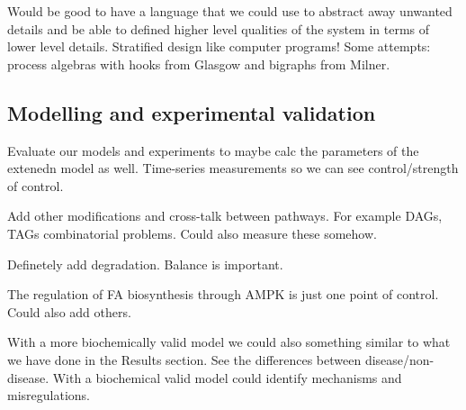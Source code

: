 Would be good to have a language that we could use to abstract away
unwanted details and be able to defined higher level qualities of the
system in terms of lower level details. Stratified design like
computer programs! Some attempts: process algebras with hooks from
Glasgow and bigraphs from Milner.

\subsection{Modelling and experimental validation}
Evaluate our models and experiments to maybe calc the parameters of
the extenedn model as well. Time-series measurements so we can see
control/strength of control.

Add other modifications and cross-talk between pathways. For example
DAGs, TAGs combinatorial problems. Could also measure these somehow.

Definetely add degradation. Balance is important.

The regulation of FA biosynthesis through AMPK is just one point of
control. Could also add others.

With a more biochemically valid model we could also something similar
to what we have done in the Results section. See the differences
between disease/non-disease. With a biochemical valid model could
identify mechanisms and misregulations.






